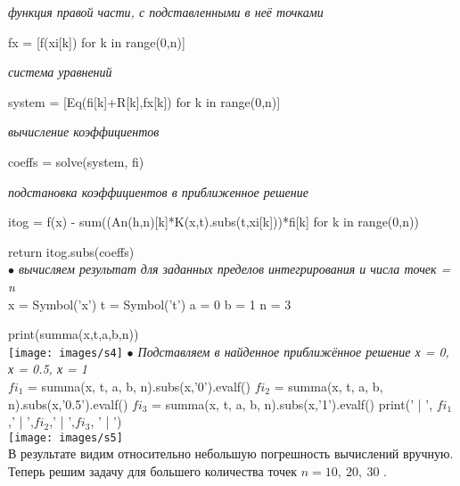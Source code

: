 \documentclass[12pt]{article}
\begin{document}
\textit{ функция правой части, с подставленными в неё точками} \vskip 0.3cm
 
 fx = [f(xi[k]) for k in range(0,n)] \vskip 0.3cm
 
\textit{ система уравнений} \vskip 0.3cm
 
 system = [Eq(fi[k]+R[k],fx[k]) for k in range(0,n)] \vskip 0.3cm
 
\textit{ вычисление коэффициентов} \vskip 0.3cm
 
 coeffs = solve(system, fi) \vskip 0.3cm
 
\textit{ подстановка коэффициентов в приближенное решение} \vskip 0.3cm
 
 itog = f(x) - sum((An(h,n)[k]*K(x,t).subs(t,xi[k]))*fi[k] for k in range(0,n)) \vskip 0.3cm
 
 
 return itog.subs(coeffs)\\
 
 \textit{$ \bullet $    вычисляем результат для заданных пределов интегрирования и числа точек = n
 	}\\
 	
 x = Symbol('x') \vskip 0.3cm
                 t = Symbol('t') \vskip 0.3cm
                 a = 0 \vskip 0.3cm
                 b = 1 \vskip 0.3cm
                 n = 3 \vskip 0.3cm
                 
                 print(summa(x,t,a,b,n)) \\
                 
\texttt{[image: images/s4]}                 
\textit{$ \bullet $                     Подставляем в найденное приближённое решение х = 0, х = 0.5, х = 1}\\

 $ fi_1 $ = summa(x, t, a, b, n).subs(x,'0').evalf() \vskip 0.3cm
 $ fi_2 $ = summa(x, t, a, b, n).subs(x,'0.5').evalf() \vskip 0.3cm
 $ fi_3 $ = summa(x, t, a, b, n).subs(x,'1').evalf() \vskip 0.3cm
 print(' | ', $ fi_1 $,' | ',$ fi_2 $,' | ',$ fi_3 $, ' | ')\\
 
\texttt{[image: images/s5]}   \\
\newpage            
В результате видим относительно небольшую погрешность вычислений вручную. Теперь решим задачу для большего количества точек $ n = 10, \: 20, \: 30 $ . \\
\end{document}
